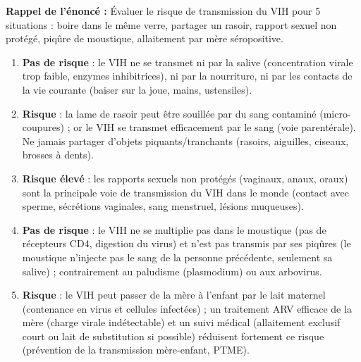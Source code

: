 \documentclass[11pt]{article}
\begin{document}
\begin{corrige}
\textbf{Rappel de l'énoncé :} Évaluer le risque de transmission du VIH pour 5 situations : boire dans le même verre, partager un rasoir, rapport sexuel non protégé, piqûre de moustique, allaitement par mère séropositive.
\tcblower
\begin{enumerate}
\item \textbf{Pas de risque} : le VIH ne se transmet ni par la salive (concentration virale trop faible, enzymes inhibitrices), ni par la nourriture, ni par les contacts de la vie courante (baiser sur la joue, mains, ustensiles).
\item \textbf{Risque} : la lame de rasoir peut être souillée par du sang contaminé (micro-coupures) ; or le VIH se transmet efficacement par le sang (voie parentérale). Ne jamais partager d'objets piquants/tranchants (rasoirs, aiguilles, ciseaux, brosses à dents).
\item \textbf{Risque élevé} : les rapports sexuels non protégés (vaginaux, anaux, oraux) sont la principale voie de transmission du VIH dans le monde (contact avec sperme, sécrétions vaginales, sang menstruel, lésions muqueuses).
\item \textbf{Pas de risque} : le VIH ne se multiplie pas dans le moustique (pas de récepteurs CD4, digestion du virus) et n'est pas transmis par ses piqûres (le moustique n'injecte pas le sang de la personne précédente, seulement sa salive) ; contrairement au paludisme (plasmodium) ou aux arbovirus.
\item \textbf{Risque} : le VIH peut passer de la mère à l'enfant par le lait maternel (contenance en virus et cellules infectées) ; un traitement ARV efficace de la mère (charge virale indétectable) et un suivi médical (allaitement exclusif court ou lait de substitution si possible) réduisent fortement ce risque (prévention de la transmission mère-enfant, PTME).
\end{enumerate}
\end{corrige}
\end{document}
